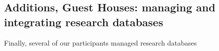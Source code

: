 \subsection{Additions, Guest Houses: managing and integrating research databases}

Finally, several of our participants managed research databases 




